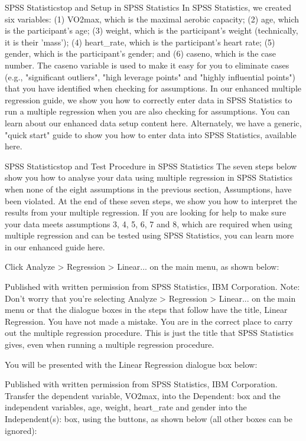 \documentclass[]{article}
\begin{document}
	SPSS Statisticstop and
	Setup in SPSS Statistics
	In SPSS Statistics, we created six variables: (1) VO2max, which is the maximal aerobic capacity; (2) age, which is the participant's age; (3) weight, which is the participant's weight (technically, it is their 'mass'); (4) heart\_rate, which is the participant's heart rate; (5) gender, which is the participant's gender; and (6) caseno, which is the case number. The caseno variable is used to make it easy for you to eliminate cases (e.g., "significant outliers", "high leverage points" and "highly influential points") that you have identified when checking for assumptions. In our enhanced multiple regression guide, we show you how to correctly enter data in SPSS Statistics to run a multiple regression when you are also checking for assumptions. You can learn about our enhanced data setup content here. Alternately, we have a generic, "quick start" guide to show you how to enter data into SPSS Statistics, available here.
	
	SPSS Statisticstop and
	Test Procedure in SPSS Statistics
	The seven steps below show you how to analyse your data using multiple regression in SPSS Statistics when none of the eight assumptions in the previous section, Assumptions, have been violated. At the end of these seven steps, we show you how to interpret the results from your multiple regression. If you are looking for help to make sure your data meets assumptions 3, 4, 5, 6, 7 and 8, which are required when using multiple regression and can be tested using SPSS Statistics, you can learn more in our enhanced guide here.
	
	Click Analyze > Regression > Linear... on the main menu, as shown below:
	
	
	Published with written permission from SPSS Statistics, IBM Corporation.
	Note: Don't worry that you're selecting Analyze > Regression > Linear... on the main menu or that the dialogue boxes in the steps that follow have the title, Linear Regression. You have not made a mistake. You are in the correct place to carry out the multiple regression procedure. This is just the title that SPSS Statistics gives, even when running a multiple regression procedure.
	
	You will be presented with the Linear Regression dialogue box below:
	
	
	Published with written permission from SPSS Statistics, IBM Corporation.
	Transfer the dependent variable, VO2max, into the Dependent: box and the independent variables, age, weight, heart\_rate and gender into the Independent(s): box, using the  buttons, as shown below (all other boxes can be ignored):
	
\end{document}
